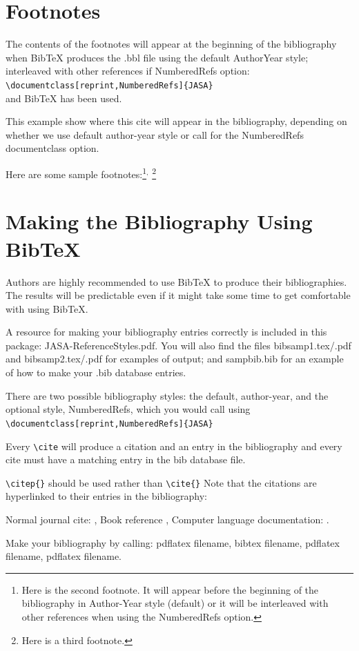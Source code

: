 \documentclass[reprint]{JASA}
\begin{document}
\section{Footnotes}
The contents of the footnotes will appear at the beginning of the
bibliography when BibTeX produces the .bbl file using the default
AuthorYear style; interleaved with other references if 
Numbered\-Refs option:\\
\verb+\documentclass[reprint,NumberedRefs]{JASA}+\\
and BibTeX has been used.

This example show where this cite \citep{booksamp1} will appear in the
bibliography,
depending on whether we use default author-year style
or call for the NumberedRefs documentclass option.

Here are some sample footnotes:\footnote{Here is the second footnote.
It will appear before the beginning of the bibliography in Author-Year
style (default) or it will be 
 interleaved with other references when using the Numbered\-Refs
 option.}$^,$%
\footnote{Here is a third footnote.}


\section{Making the Bibliography Using BibTeX}
Authors are highly  recommended to use BibTeX to produce their
bibliographies. The results will be predictable
 even if
it might take some time to get comfortable with  using BibTeX.

A resource for making your bibliography entries
correctly is included in this package: 
JASA-ReferenceStyles.pdf. You will also find
the files
bibsamp1.tex/.pdf and bibsamp2.tex/.pdf
for examples of output; and sampbib.bib for an example of
how to make your .bib database entries.

There are two possible bibliography styles: the default, author-year,
and the optional style, Numbered\-Refs, which you would call using\\
{\verb+\documentclass[reprint,NumberedRefs]{JASA}+ }

Every \verb+\cite+ will produce a citation and an entry in the
bibliography and every cite must have a matching entry in the bib
database file.

\verb+\citep{}+ should be used rather than \verb+\cite{}+
Note that the citations are hyperlinked to their entries in the
bibliography:

Normal journal cite: \citep{joursamp1},
 Book reference \citet{booksamp1},
Computer language documentation:
\citep{sampcode2}.


Make your bibliography by calling: pdflatex filename,  bibtex filename,
pdflatex filename, pdflatex filename.


\end{document}

